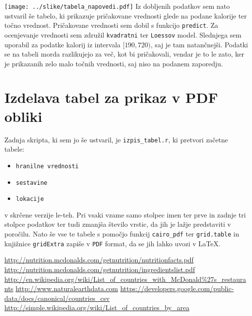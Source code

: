 \documentclass[hidelinks, 11pt,a4paper]{article}
\begin{document}
\texttt{[image: ../slike/tabela\_napovedi.pdf]}
\noindent
Iz dobljenih podatkov sem nato ustvaril še tabelo, ki prikazuje pričakovane vrednosti glede na podane kalorije ter točno vrednost. Pričakovane vrednosti sem dobil s funkcijo \verb|predict|. Za ocenjevanje vrednosti sem združil \verb|kvadratni| ter \verb|Loessov| model. Slednjega sem uporabil za podatke kalorij iz intervala $[190, 720)$, saj je tam natančnejši. Podatki se na tabeli morda razlikujejo za več, kot bi pričakovali, vendar je to le zato, ker je prikazanih zelo malo točnih vrednosti, saj niso na podanem zaporedju.

\begin{figure}
\end{figure}

\newpage
\section{Izdelava tabel za prikaz v PDF obliki}

Zadnja skripta, ki sem jo še ustvaril, je \verb|izpis_tabel.r|, ki pretvori začetne tabele:

\begin{itemize}
	\item \verb|hranilne vrednosti|
	\item \verb|sestavine|
	\item \verb|lokacije|
\end{itemize}

\noindent
v skrčene verzije le-teh. Pri vsaki vzame samo stolpec imen ter prve in zadnje tri stolpce podatkov ter tudi zmanjša število vrstic, da jih je lažje predstaviti v poročilu. Nato še vse te tabele s pomočjo funkcij \verb|cairo_pdf| ter \verb|grid.table| in knjižnice \verb|gridExtra| zapiše v \verb|PDF| format, da se jih lahko uvozi v \LaTeX.

\newpage
\begin{thebibliography}{99}
	 \url{http://nutrition.mcdonalds.com/getnutrition/nutritionfacts.pdf}
	 \url{http://nutrition.mcdonalds.com/getnutrition/ingredientslist.pdf}
	 \url{http://en.wikipedia.org/wiki/List_of_countries_with_McDonald%27s_restaurants}
	 \url{http://www.naturalearthdata.com}
	 \url{https://developers.google.com/public-data/docs/canonical/countries_csv}
	 \url{http://simple.wikipedia.org/wiki/List_of_countries_by_area}
\end{thebibliography}
\end{document}
